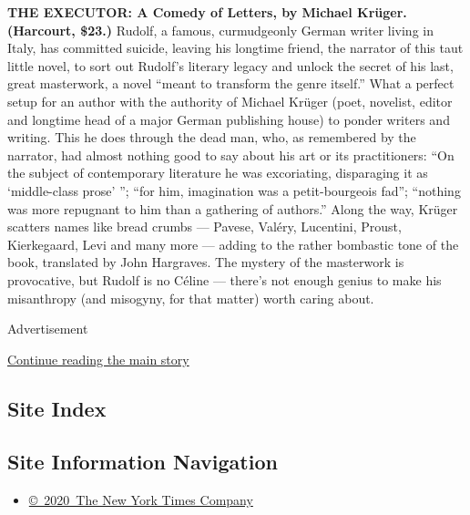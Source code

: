 \textbf{THE EXECUTOR: A Comedy of Letters, by Michael Krüger. (Harcourt,
\$23.)} Rudolf, a famous, curmudgeonly German writer living in Italy,
has committed suicide, leaving his longtime friend, the narrator of this
taut little novel, to sort out Rudolf's literary legacy and unlock the
secret of his last, great masterwork, a novel ``meant to transform the
genre itself.'' What a perfect setup for an author with the authority of
Michael Krüger (poet, novelist, editor and longtime head of a major
German publishing house) to ponder writers and writing. This he does
through the dead man, who, as remembered by the narrator, had almost
nothing good to say about his art or its practitioners: ``On the subject
of contemporary literature he was excoriating, disparaging it as
`middle-class prose' ''; ``for him, imagination was a petit-bourgeois
fad''; ``nothing was more repugnant to him than a gathering of
authors.'' Along the way, Krüger scatters names like bread crumbs ---
Pavese, Valéry, Lucentini, Proust, Kierkegaard, Levi and many more ---
adding to the rather bombastic tone of the book, translated by John
Hargraves. The mystery of the masterwork is provocative, but Rudolf is
no Céline --- there's not enough genius to make his misanthropy (and
misogyny, for that matter) worth caring about.

Advertisement

\protect\hyperlink{after-bottom}{Continue reading the main story}

\hypertarget{site-index}{%
\subsection{Site Index}\label{site-index}}

\hypertarget{site-information-navigation}{%
\subsection{Site Information
Navigation}\label{site-information-navigation}}

\begin{itemize}
\tightlist
\item
  \href{https://help.nytimes3xbfgragh.onion/hc/en-us/articles/115014792127-Copyright-notice}{©~2020~The
  New York Times Company}
\end{itemize}

